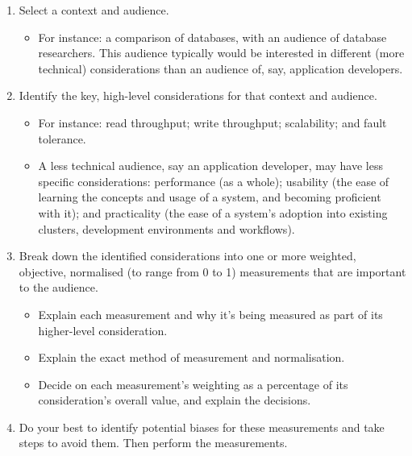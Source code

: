   \begin{enumerate}
    \item Select a context and audience.
    \begin{itemize}
      \item For instance: a comparison of databases, with an audience of database researchers. This audience typically would be interested in different (more technical) considerations than an audience of, say, application developers.
    \end{itemize}

    \item Identify the key, high-level considerations for that context and audience.
    \begin{itemize}
      \item For instance: read throughput; write throughput; scalability; and fault tolerance.
      \item A less technical audience, say an application developer, may have less specific considerations: performance (as a whole); usability (the ease of learning the concepts and usage of a system, and becoming proficient with it); and practicality (the ease of a system's adoption into existing clusters, development environments and workflows).
    \end{itemize}

    \item Break down the identified considerations into one or more weighted, objective, normalised (to range from 0 to 1) measurements that are important to the audience.
    \begin{itemize}
      \item Explain each measurement and why it's being measured as part of its higher-level consideration.
      \item Explain the exact method of measurement and normalisation.
      \item Decide on each measurement's weighting as a percentage of its consideration's overall value, and explain the decisions.
    \end{itemize}

    \item Do your best to identify potential biases for these measurements and take steps to avoid them. Then perform the measurements.


\end{enumerate}
